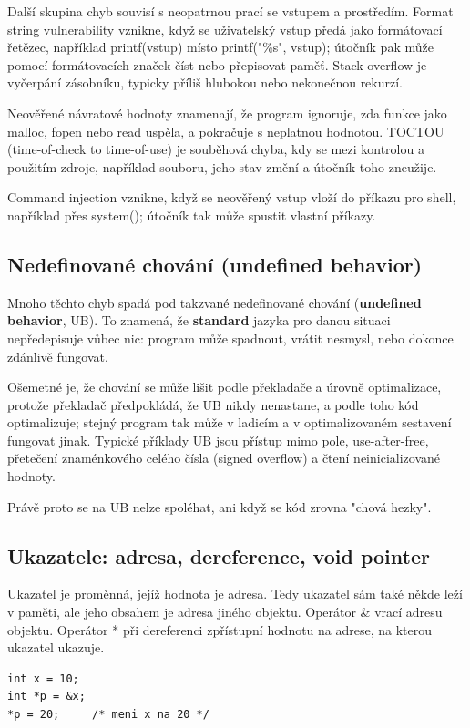 Další skupina chyb souvisí s neopatrnou prací se vstupem a prostředím. Format string vulnerability vznikne, když se uživatelský vstup předá jako formátovací řetězec, například printf(vstup) místo printf("\%s", vstup); útočník pak může pomocí formátovacích značek číst nebo přepisovat paměť. Stack overflow je vyčerpání zásobníku, typicky příliš hlubokou nebo nekonečnou rekurzí.

Neověřené návratové hodnoty znamenají, že program ignoruje, zda funkce jako malloc, fopen nebo read uspěla, a pokračuje s neplatnou hodnotou. TOCTOU (time-of-check to time-of-use) je souběhová chyba, kdy se mezi kontrolou a použitím zdroje, například souboru, jeho stav změní a útočník toho zneužije.

Command injection vznikne, když se neověřený vstup vloží do příkazu pro shell, například přes system(); útočník tak může spustit vlastní příkazy.

\subsection*{Nedefinované chování (undefined behavior)}

Mnoho těchto chyb spadá pod takzvané nedefinované chování (\textbf{undefined behavior}, UB). To znamená, že \textbf{standard} jazyka pro danou situaci nepředepisuje vůbec nic: program může spadnout, vrátit nesmysl, nebo dokonce zdánlivě fungovat.

Ošemetné je, že chování se může lišit podle překladače a úrovně optimalizace, protože překladač předpokládá, že UB nikdy nenastane, a podle toho kód optimalizuje; stejný program tak může v ladicím a v optimalizovaném sestavení fungovat jinak. Typické příklady UB jsou přístup mimo pole, use-after-free, přetečení znaménkového celého čísla (signed overflow) a čtení neinicializované hodnoty.

Právě proto se na UB nelze spoléhat, ani když se kód zrovna "chová hezky".

\subsection*{Ukazatele: adresa, dereference, void pointer}

Ukazatel je proměnná, jejíž hodnota je adresa. Tedy ukazatel sám také někde leží v paměti, ale jeho obsahem je adresa jiného objektu. Operátor \& vrací adresu objektu. Operátor * při dereferenci zpřístupní hodnotu na adrese, na kterou ukazatel ukazuje.

\begin{codebox}
\small
\begin{verbatim}
int x = 10;
int *p = &x;
*p = 20;     /* meni x na 20 */
\end{verbatim}
\end{codebox}

